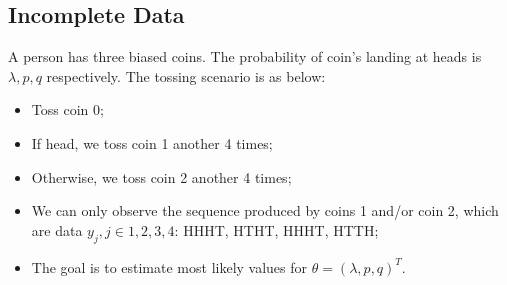 \documentclass{article}  %
\begin{document}
\subsection{Incomplete Data} A person has three biased coins. The probability of
coin's landing at heads is $\lambda,p,q$ respectively. The tossing scenario is
as below:
\begin{itemize}
\item Toss coin 0;
\item If head, we toss coin 1 another 4 times;
\item Otherwise, we toss coin 2 another 4 times;
\item We can only observe the sequence produced by coins 1 and/or coin 2, which
are data $y_j, j \in 1,2,3,4$: HHHT, HTHT, HHHT, HTTH;
\item The goal is to estimate most likely values for $\theta = (\lambda, p,
q)^T$.
\end{itemize}
\end{document}
